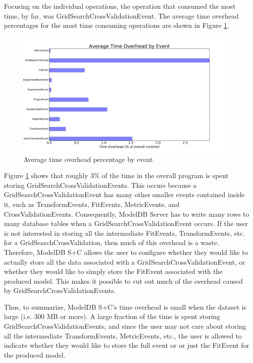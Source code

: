 Focusing on the individual operations, the operation that consumed the most time, by far, was
GridSearchCrossValidationEvent. The average time overhead percentages for the most time
consuming operations are shown in Figure \ref{fig:event_time_overhead}.

\begin{figure}
  \centering
  \includegraphics[width=6.0in]{event_time_overhead}
  \caption{
    Average time overhead percentage by event.
  }
  \label{fig:event_time_overhead}
\end{figure}

Figure \ref{fig:event_time_overhead} shows that roughly 3\% of the time in the overall
program is spent storing GridSearchCrossValidationEvents. This occurs because a GridSearchCrossValidationEvent
has many other smaller events contained inside it, such as TransformEvents, FitEvents, MetricEvents, and 
CrossValidationEvents. Consequently, ModelDB Server has to write many rows to many database tables when a
GridSearchCrossValidationEvent occurs. If the user is not interested in storing all the intermediate FitEvents,
TransformEvents, etc. for a GridSearchCrossValidation, then much of this overhead is a waste. Therefore, ModelDB S+C
allows the user to configure whether they would like to actually store all the data associated with a GridSearchCrossValidationEvent,
or whether they would like to simply store the FitEvent associated with the produced model. This makes it possible to cut out
much of the overhead caused by GridSearchCrossValidationEvents.

Thus, to summarize, ModelDB S+C's time overhead is small when the dataset is large (i.e. 300 MB or more). A
large fraction of the time is spent storing GridSearchCrossValidationEvents, and since the user may not
care about storing all the intermediate TransformEvents, MetricEvents, etc., the user is allowed to indicate 
whether they would like to store the full event or or just the FitEvent for the produced model.


